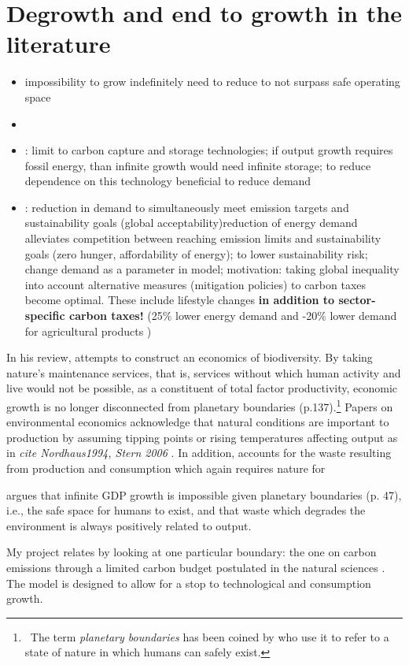 \section{Degrowth and end to growth in the literature}
\begin{itemize}
	\item \cite{Dasgupta2021}\ar impossibility to grow indefinitely \ar need to reduce to not surpass safe operating space
	\item \cite{Schor2005SustainableReduction}
	\item \cite{VanVuuren2018AlternativeTechnologies}: limit to carbon capture and storage technologies; if output growth requires fossil energy, than infinite growth would need infinite storage; to reduce dependence on this technology beneficial to reduce demand 
	\item \cite{Bertram2018TargetedScenarios}: reduction in demand to simultaneously meet emission targets and sustainability goals (global acceptability)\ar reduction of energy demand alleviates competition between reaching emission limits and sustainability goals (zero hunger, affordability of energy); to lower sustainability risk;
	\\   change demand as a parameter in  model; motivation: taking global inequality into account alternative measures (mitigation policies) to carbon taxes  become optimal. These include lifestyle changes \textbf{in addition to sector-specific carbon taxes!} (25\% lower energy demand and -20\% lower demand for agricultural products )
\end{itemize}

In his review, \cite{Dasgupta2021} attempts to construct an economics of biodiversity. By taking nature's maintenance services, that is, services without which human activity and live would not be possible, as a constituent of total factor productivity, economic growth is no longer disconnected from planetary boundaries (p.137).\footnote{\ The term \textit{planetary boundaries} has been coined by \cite{Rockstrom2009AHumanity} who use it to refer to a state of nature in which humans can safely exist.} 
Papers on environmental economics acknowledge that natural conditions are important to production by assuming tipping points \citep{Acemoglu2012TheChange} or rising temperatures affecting output as in \textit{cite Nordhaus1994, Stern 2006} \cite{Barrage2019OptimalPolicy}.
In addition, \cite{Dasgupta2021} accounts for the waste resulting from production and consumption which again requires nature for 

\cite{Dasgupta2021} argues that infinite GDP growth is impossible given planetary boundaries (p. 47), i.e., the safe space for humans to exist, and that waste which degrades the environment is always positively related to output. 

My project relates by looking at one particular boundary: the one on carbon emissions through a limited carbon budget postulated in the natural sciences \citep{IPCC2022, Rockstrom2009AHumanity}. The model is designed to allow for a stop to technological and consumption growth. 

 